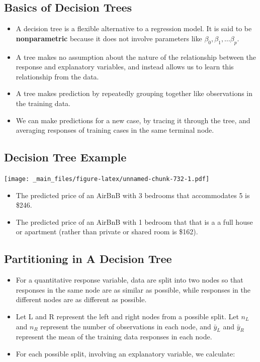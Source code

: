 \documentclass[]{book}
\begin{document}
\subsection{Basics of Decision Trees}\label{basics-of-decision-trees}

\begin{itemize}
\item
  A decision tree is a flexible alternative to a regression model. It is
  said to be \textbf{nonparametric} because it does not involve
  parameters like \(\beta_0, \beta_1, \ldots \beta_p\).
\item
  A tree makes no assumption about the nature of the relationship
  between the response and explanatory variables, and instead allows us
  to learn this relationship from the data.
\item
  A tree makes prediction by repeatedly grouping together like
  observations in the training data.
\item
  We can make predictions for a new case, by tracing it through the
  tree, and averaging responses of training cases in the same terminal
  node.
\end{itemize}

\subsection{Decision Tree Example}\label{decision-tree-example}

\texttt{[image: \_main\_files/figure-latex/unnamed-chunk-732-1.pdf]}

\begin{itemize}
\item
  The predicted price of an AirBnB with 3 bedrooms that accommodates 5
  is \$246.
\item
  The predicted price of an AirBnB with 1 bedroom that that is a a full
  house or apartment (rather than private or shared room is \$162).
\end{itemize}

\subsection{Partitioning in A Decision
Tree}\label{partitioning-in-a-decision-tree}

\begin{itemize}
\item
  For a quantitative response variable, data are split into two nodes so
  that responses in the same node are as similar as possible, while
  responses in the different nodes are as different as possible.
\item
  Let L and R represent the left and right nodes from a possible split.
  Let \(n_L\) and \(n_R\) represent the number of observations in each
  node, and \(\bar{y}_L\) and \(\bar{y}_R\) represent the mean of the
  training data responses in each node.
\item
  For each possible split, involving an explanatory variable, we
  calculate:
\end{itemize}
\end{document}
